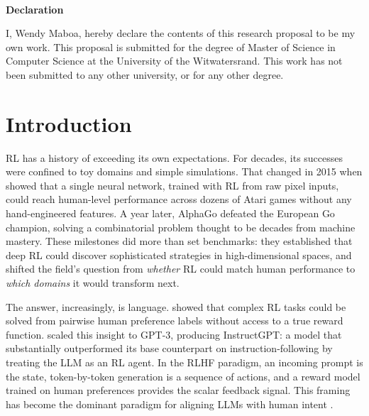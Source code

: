 \documentclass[a4paper,twoside,12pt]{report}
\newenvironment{declaration}{%
  \ \vfill\begin{center}\textbf{Declaration}\end{center}%
  \addcontentsline{toc}{section}{Declaration}}{\vfill\vfill\newpage}
\begin{document}
\begin{declaration}
I, Wendy Maboa, hereby declare the contents of this research proposal to be my own work.
This proposal is submitted for the degree of Master of Science in Computer Science at the
University of the Witwatersrand. This work has not been submitted to any other university,
or for any other degree.
\end{declaration}

{}
\tableofcontents
\newpage
{}

\chapter{Introduction}
\label{ch:intro}

RL has a history of exceeding its own expectations. For decades, its successes were confined
to toy domains and simple simulations. That changed in 2015 when \citet{mnih2015humanlevel}
showed that a single neural network, trained with RL from raw pixel inputs, could reach
human-level performance across dozens of Atari games without any hand-engineered features. A
year later, AlphaGo \citep{silver2016mastering} defeated the European Go champion, solving a
combinatorial problem thought to be decades from machine mastery. These milestones did more
than set benchmarks: they established that deep RL could discover sophisticated strategies in
high-dimensional spaces, and shifted the field's question from \emph{whether} RL could match
human performance to \emph{which domains} it would transform next.

The answer, increasingly, is language. \citet{christiano2017deep} showed that complex RL
tasks could be solved from pairwise human preference labels without access to a true reward
function. \citet{ouyang2022training} scaled this insight to GPT-3, producing InstructGPT: a
model that substantially outperformed its base counterpart on instruction-following by
treating the LLM as an RL agent. In the RLHF paradigm, an incoming prompt is the state,
token-by-token generation is a sequence of actions, and a reward model trained on human
preferences provides the scalar feedback signal. This framing has become the dominant
paradigm for aligning LLMs with human intent \citep{lambert2023entangled}.
\end{document}
